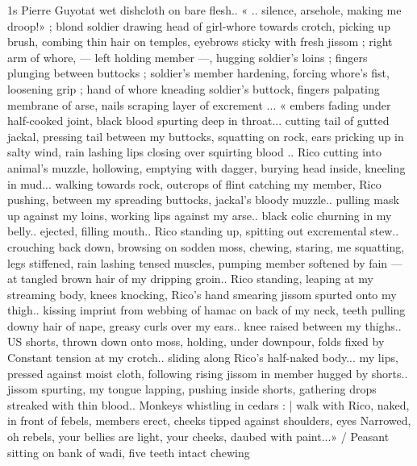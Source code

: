 1s Pierre Guyotat
wet dishcloth on bare flesh.. « .. silence, arsehole, making me
droop!» ; blond soldier drawing head of girl-whore towards crotch,
picking up brush, combing thin hair on temples, eyebrows sticky with
fresh jissom ; right arm of whore, — left holding member —,
hugging soldier's loins ; fingers plunging between buttocks ;
soldier's member hardening, forcing whore's fist, loosening grip ;
hand of whore kneading soldier's buttock, fingers palpating
membrane of arse, nails scraping layer of excrement ... « embers
fading under half-cooked joint, black blood spurting deep in throat...
cutting tail of gutted jackal, pressing tail between my buttocks,
squatting on rock, ears pricking up in salty wind, rain lashing lips
closing over squirting blood .. Rico cutting into animal's muzzle,
hollowing, emptying with dagger, burying head inside, kneeling in
mud... walking towards rock, outcrops of flint catching my member,
Rico pushing, between my spreading buttocks, jackal’s bloody
muzzle.. pulling mask up against my loins, working lips against my
arse.. black colic churning in my belly.. ejected, filling mouth.. Rico
standing up, spitting out excremental stew.. crouching back down,
browsing on sodden moss, chewing, staring, me squatting, legs
stiffened, rain lashing tensed muscles, pumping member softened by
fain — at tangled brown hair of my dripping groin.. Rico standing,
leaping at my streaming body, knees knocking, Rico's hand smearing
jissom spurted onto my thigh.. kissing imprint from webbing of
hamac on back of my neck, teeth pulling downy hair of nape, greasy
curls over my ears.. knee raised between my thighs.. US shorts,
thrown down onto moss, holding, under downpour, folds fixed by
Constant tension at my crotch.. sliding along Rico's half-naked body...
my lips, pressed against moist cloth, following rising jissom in
member hugged by shorts.. jissom spurting, my tongue lapping,
pushing inside shorts, gathering drops streaked with thin blood..
Monkeys whistling in cedars : | walk with Rico, naked, in front of
febels, members erect, cheeks tipped against shoulders, eyes
Narrowed, oh rebels, your bellies are light, your cheeks, daubed with
paint...» / Peasant sitting on bank of wadi, five teeth intact chewing


